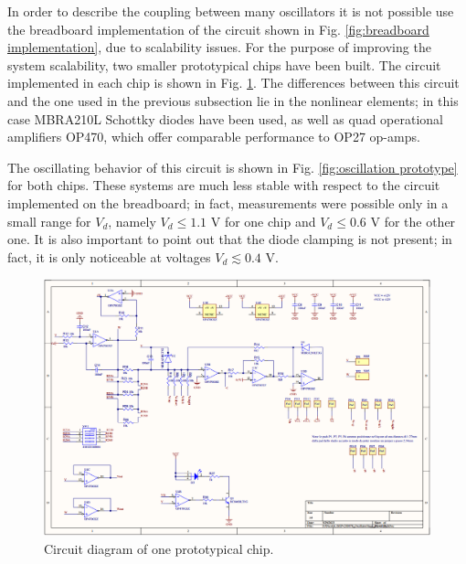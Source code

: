 \documentclass[a4paper,11pt,aps,secnumarabic,balancelastpage,amsmath,amssymb,floatfix,table]{article}
\begin{document}
In order to describe the coupling between many oscillators it is
not possible use the breadboard implementation of the circuit
shown in Fig. \ref{fig:breadboard implementation}, due to
scalability issues. For the purpose of improving the system
scalability, two smaller prototypical chips have been built.
The circuit implemented in each chip is shown in Fig.
\ref{fig:prototype implementation}. The differences between this
circuit and the one used in the previous subsection lie in the nonlinear
elements; in this case MBRA210L Schottky diodes have been used,
as well as quad operational amplifiers OP470, which offer
comparable performance to OP27 op-amps.

The oscillating behavior of this circuit is shown in Fig.
\ref{fig:oscillation prototype} for both chips. These systems are much
less stable with respect to the circuit implemented on the breadboard;
in fact, measurements were possible only in a small range for $V_d$,
namely $V_d \leq 1.1$ V for one chip and $V_d \leq 0.6$ V for the
other one. It is also important to point out that the diode clamping
is not present; in fact, it is only noticeable at voltages
$V_d \lesssim 0.4$ V.


\begin{figure}[H]
    \centering
    \includegraphics[width=0.75\linewidth]
    {../1_block/prototypes/prototype_implementation.png}
    \caption{Circuit diagram of one prototypical chip.}
    \label{fig:prototype implementation}
\end{figure}
\end{document}
